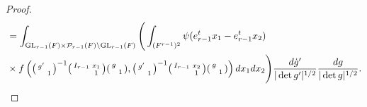 \documentclass[12pt]{amsart}
\theoremstyle{remark}
\numberwithin{equation}{section}
\newcommand{\GL}{\mathrm{GL}}
\theoremstyle{definition}
\newenvironment{psmatrix}
  {\left(\begin{smallmatrix}}
  {\end{smallmatrix}\right)}
\numberwithin{equation}{subsection}
\begin{document}
\begin{proof}
\begin{align*}
    &=\int_{\GL_{r-1}(F)\times \mathcal{P}_{r-1}(F) \backslash \GL_{r-1}(F)}\Bigg(\int_{(F^{r-1})^2}\psi(e_{r-1}^tx_1-e_{r-1}^tx_2)\\& \times f\left(\begin{psmatrix} g' & \\ & 1 \end{psmatrix}^{-1}\begin{psmatrix}I_{r-1} & x_1\\ & 1 \end{psmatrix} \begin{psmatrix} g & \\ & 1 \end{psmatrix} ,\begin{psmatrix}  g'& \\ & 1 \end{psmatrix}^{-1}\begin{psmatrix}I_{r-1} & x_2\\ & 1 \end{psmatrix} \begin{psmatrix} g & \\ & 1 \end{psmatrix}\right)dx_1 dx_2 \Bigg) \frac{d\dot{g}'}{|\det g'|^{1/2}}\frac{dg}{|\det g|^{1/2}}.
\end{align*}


\end{proof}
\end{document}
